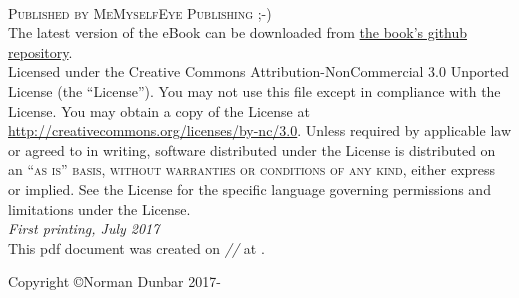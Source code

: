 \documentclass[11pt,fleqn]{book} %
\begin{document}
\frontmatter			%
                        



\newpage
~\vfill
\thispagestyle{empty}

\noindent \textsc{Published by MeMyselfEye Publishing ;-)}\\ %

\noindent The latest version of the eBook can be downloaded from \href{https://github.com/NormanDunbar/OracleTraceFilesExplained/releases/latest}{the book's github repository}.\\ %

\noindent Licensed under the Creative Commons Attribution-NonCommercial 3.0 Unported License (the ``License''). You may not use this file except in compliance with the License. You may obtain a copy of the License at \url{http://creativecommons.org/licenses/by-nc/3.0}. Unless required by applicable law or agreed to in writing, software distributed under the License is distributed on an \textsc{``as is'' basis, without warranties or conditions of any kind}, either express or implied. See the License for the specific language governing permissions and limitations under the License.\\ %

\noindent \textit{First printing, July 2017} \\%


\noindent This pdf document was created on \textit{\the\day/\the\month/\the\year} at \textit{\DTMcurrenttime}.

\noindent Copyright \copyright Norman Dunbar 2017-\the\year \\ %

\end{document}
